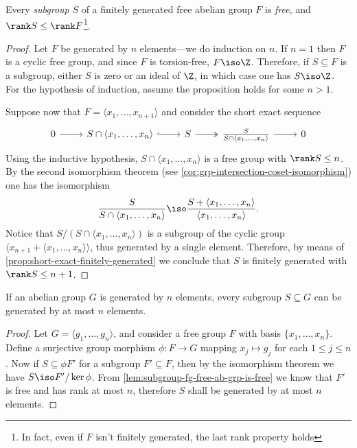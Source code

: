 \begin{lemma}
    \label{lem:subgroup-fg-free-ab-grp-is-free}
    Every \emph{subgroup} \(S\) of a finitely generated free abelian group \(F\) is
    \emph{free}, and \(\rank S \leq \rank F\)\footnote{In fact, even if \(F\) isn't
        finitely generated, the last rank property holds}.
\end{lemma}

\begin{proof}
    Let \(F\) be generated by \(n\) elements---we do induction on \(n\). If
    \(n = 1\) then \(F\) is a cyclic free group, and since \(F\) is torsion-free,
    \(F \iso \Z\). Therefore, if \(S \subseteq F\) is a subgroup, either \(S\) is
    zero or an ideal of \(\Z\), in which case one has \(S \iso \Z\). For the
    hypothesis of induction, assume the proposition holds for some \(n > 1\).

    Suppose now that \(F = \langle x_1, \dots, x_{n+1} \rangle\) and consider the
    short exact sequence
    \[
        \begin{tikzcd}
            0 \ar[r]
            &S \cap \langle x_1, \dots, x_n \rangle \ar[r, hook]
            &S \ar[r, two heads]
            &\frac{S}{S \cap \langle x_1, \dots, x_n \rangle} \ar[r]
            &0
        \end{tikzcd}
    \]
    Using the inductive hypothesis, \(S \cap \langle x_1, \dots, x_n \rangle\) is a
    free group with \(\rank S \leq n\). By the second isomorphism theorem (see
    \cref{cor:grp-intersection-coset-isomorphism}) one has the isomorphism
    \[
        \frac{S}{S \cap \langle x_1, \dots, x_n \rangle}
        \iso
        \frac{S + \langle x_1, \dots, x_n \rangle}{\langle x_1, \dots, x_n \rangle}.
    \]
    Notice that \(S/(S \cap \langle x_1, \dots, x_n \rangle)\) is a subgroup of the
    cyclic group \(\langle x_{n+1} + \langle x_1, \dots, x_n \rangle \rangle\), thus
    generated by a single element. Therefore, by means of
    \cref{prop:short-exact-finitely-generated} we conclude that \(S\) is finitely
    generated with \(\rank S \leq n + 1\).
\end{proof}

\begin{corollary}
    \label{cor:subgroup-fg-is-fg}
    If an abelian group \(G\) is generated by \(n\) elements, every subgroup
    \(S \subseteq G\) can be generated by at most \(n\) elements.
\end{corollary}

\begin{proof}
    Let \(G = \langle g_1, \dots, g_n \rangle\), and consider a free group \(F\)
    with basis \(\{x_1, \dots, x_n\}\). Define a surjective group morphism
    \(\phi: F \to G\) mapping \(x_j \mapsto g_j\) for each \(1 \leq j \leq n\). Now
    if \(S \subseteq \phi F'\) for a subgroup \(F' \subseteq F\), then by the
    isomorphism theorem we have \(S \iso F'/\ker \phi\). From
    \cref{lem:subgroup-fg-free-ab-grp-is-free} we know that \(F'\) is free and has
    rank at most \(n\), therefore \(S\) shall be generated by at most \(n\)
    elements.
\end{proof}

